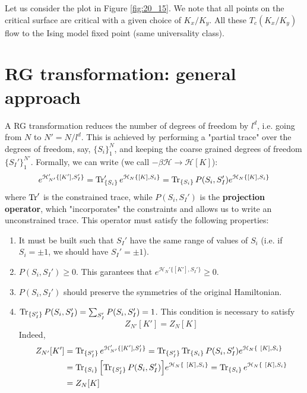 \documentclass[../main/main.tex]{subfiles}
\begin{document}
Let us consider the plot in Figure \ref{fig:20_15}. We note that all points on the critical surface are critical with a given choice of \( K_x/K_y \). All these \( T_c (K_x/K_y) \) flow to the Ising model fixed point (same universality class).


\section{RG transformation: general approach}
\label{sec:20_1}
A RG transformation reduces the number of degrees of freedom by \( l^d \), i.e. going from \( N \) to \( N' = N/l^d \).
This is achieved by performing a "partial trace" over the degrees of freedom, say, \( \{ S_i \}_1^N   \), and keeping the coarse grained degrees of freedom \( \{ S_I' \}_1^{N'}   \).
Formally, we can write (we call \( -\beta \mathcal{H} \rightarrow \mathcal{H}[K] \)):
\begin{equation}
  e^{\mathcal{H}_{N'}' \{ [K'],S_I' \}  } = \Tr_{\{ S_i \}  }' e^{ \mathcal{H}_N \{ [K],S_i \}  }  =
  \Tr_{\{ S_i \}  } P (S_i,S_I') e^{ \mathcal{H}_N \{ [K],S_i \}  }
\end{equation}
where \( \Tr'  \) is the constrained trace, while \( P (S_i,S_I')  \) is the \textbf{projection operator}, which "incorporates" the constraints and allows us to write an unconstrained trace. This operator must satisfy the following properties:
\begin{enumerate}

\item It must be built such that \( S_I' \) have the same range of values of \( S_i \) (i.e. if \( S_i = \pm 1 \), we should have \( S_I' = \pm1 \)).

\item \( P (S_i,S_I')\ge 0 \). This garantees that \( e^{\mathcal{H}_N' \{ [K'], S_I' \}  } \ge 0 \).

\item \( P (S_i, S_I') \) should preserve the symmetries of the original Hamiltonian.

\item \( \Tr_{\{ S_I' \}  } P (S_i,S_I') = \sum_{S_I'}^{}  P (S_i,S_I') = 1  \). This condition is necessary to satisfy
\begin{equation*}
  Z_{N'} [K'] = Z_N [K]
\end{equation*}
Indeed,
\begin{equation*}
\begin{split}
  Z_{N'} [K'] &= \Tr_{\{ S_I' \}  } e^{\mathcal{H}_{N'}' \{ [K'],S_I' \}  }
  = \Tr_{\{ S_I' \}  } \Tr_{\{ S_i \}  } P (S_i,S_{I}') e^{\mathcal{H}_N \{ [K],S_i \}  } \\
  & =  \Tr_{\{ S_i \}  }  \qty[ \Tr_{\{ S_I' \}  } P (S_i,S_I') ]   e^{\mathcal{H}_N \{ [K],S_i \}  }
   =  \Tr_{\{ S_i \}  }  e^{\mathcal{H}_N \{ [K],S_i \}  } \\ & = Z_N [K]
\end{split}
\end{equation*}

\end{enumerate}
\end{document}
